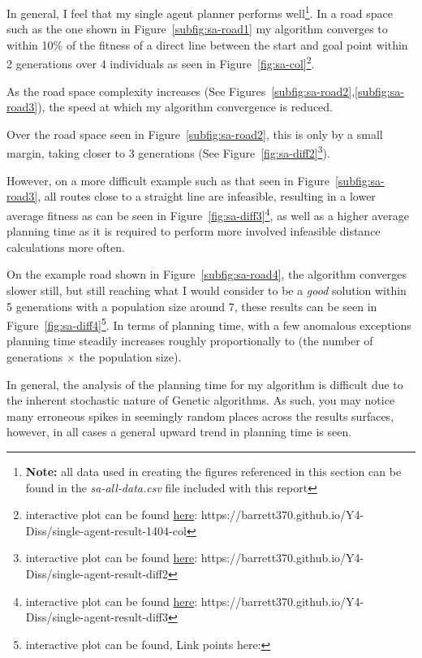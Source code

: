 
In general, I feel that my single agent planner performs well\footnote{\textbf{Note:} all data used in creating the figures referenced in this section can be found in the \textit{sa-all-data.csv} file included with this report }. In a road space such as the one shown in Figure~\ref{subfig:sa-road1} my algorithm converges to within 10\% of the fitness of a direct line between the start and goal point within 2 generations over 4 individuals as seen in Figure~\ref{fig:sa-col}\footnote{interactive plot can be found \href{https://barrett370.github.io/Y4-Diss/single-agent-result-1404-col}{here}: https://barrett370.github.io/Y4-Diss/single-agent-result-1404-col}.

As the road space complexity increases (See Figures~\ref{subfig:sa-road2},\ref{subfig:sa-road3}), the speed at which my algorithm convergence is reduced.

Over the road space seen in Figure~\ref{subfig:sa-road2}, this is only by a small margin, taking closer to 3 generations (See Figure~\ref{fig:sa-diff2}\footnote{interactive plot can be found \href{https://barrett370.github.io/Y4-Diss/single-agent-result-diff2}{here}: https://barrett370.github.io/Y4-Diss/single-agent-result-diff2}).

However, on a more difficult example such as that seen in Figure~\ref{subfig:sa-road3}, all routes close to a straight line are infeasible, resulting in a lower average fitness as can be seen in Figure~\ref{fig:sa-diff3}\footnote{interactive plot can be found \href{https://barrett370.github.io/Y4-Diss/single-agent-result-diff3}{here}: https://barrett370.github.io/Y4-Diss/single-agent-result-diff3}, as well as a higher average planning time as it is required to perform more involved infeasible distance calculations more often.

On the example road shown in Figure~\ref{subfig:sa-road4}, the algorithm converges slower still, but still reaching what I would consider to be a \textit{good} solution within 5 generations with a population size around 7, these results can be seen in Figure~\ref{fig:sa-diff4}\footnote{interactive plot can be found, Link points here:}. In terms of planning time, with a few anomalous exceptions planning time steadily increases roughly proportionally to (the number of generations $\times$ the population size).

In general, the analysis of the planning time for my algorithm is difficult due to the inherent stochastic nature of Genetic algorithms. As such, you may notice many erroneous spikes in seemingly random places across the results surfaces, however, in all cases a general upward trend in planning time is seen.

